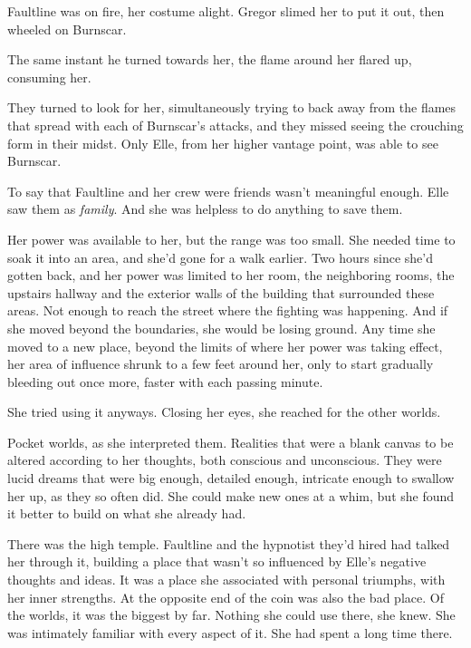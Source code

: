 Faultline was on fire, her costume alight.  Gregor slimed her to put it out, then wheeled on Burnscar.



The same instant he turned towards her, the flame around her flared up, consuming her.



They turned to look for her, simultaneously trying to back away from the flames that spread with each of Burnscar's attacks, and they missed seeing the crouching form in their midst.  Only Elle, from her higher vantage point, was able to see Burnscar.



To say that Faultline and her crew were friends wasn't meaningful enough.  Elle saw them as \emph{family}.  And she was helpless to do anything to save them.



Her power was available to her, but the range was too small.  She needed time to soak it into an area, and she'd gone for a walk earlier.  Two hours since she'd gotten back, and her power was limited to her room, the neighboring rooms, the upstairs hallway and the exterior walls of the building that surrounded these areas.  Not enough to reach the street where the fighting was happening.  And if she moved beyond the boundaries, she would be losing ground.  Any time she moved to a new place, beyond the limits of where her power was taking effect, her area of influence shrunk to a few feet around her, only to start gradually bleeding out once more, faster with each passing minute.



She tried using it anyways.  Closing her eyes, she reached for the other worlds.



Pocket worlds, as she interpreted them.  Realities that were a blank canvas to be altered according to her thoughts, both conscious and unconscious.  They were lucid dreams that were big enough, detailed enough, intricate enough to swallow her up, as they so often did.  She could make new ones at a whim, but she found it better to build on what she already had.



There was the high temple.  Faultline and the hypnotist they'd hired had talked her through it, building a place that wasn't so influenced by Elle's negative thoughts and ideas.  It was a place she associated with personal triumphs, with her inner strengths.  At the opposite end of the coin was also the bad place.  Of the worlds, it was the biggest by far.  Nothing she could use there, she knew.  She was intimately familiar with every aspect of it.  She had spent a long time there.



